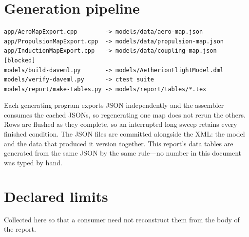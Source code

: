 \documentclass[11pt,a4paper]{article}
\begin{document}
\section{Generation pipeline}
\label{sec:pipeline}

\begin{lstlisting}
app/AeroMapExport.cpp        -> models/data/aero-map.json
app/PropulsionMapExport.cpp  -> models/data/propulsion-map.json
app/InductionMapExport.cpp   -> models/data/coupling-map.json   [blocked]
models/build-daveml.py       -> models/AetherionFlightModel.dml
models/verify-daveml.py      -> ctest suite
models/report/make-tables.py -> models/report/tables/*.tex
\end{lstlisting}

\noindent
Each generating program exports JSON independently and the assembler consumes the
cached JSONs, so regenerating one map does not rerun the others. Rows are
flushed as they complete, so an interrupted long sweep retains every
finished condition. The JSON files are committed alongside the XML: the
model and the data that produced it version together. This report's data
tables are generated from the same JSON by the same rule---no number in
this document was typed by hand.

\section{Declared limits}
\label{sec:limits}

Collected here so that a consumer need not reconstruct them from the body
of the report.
\end{document}

